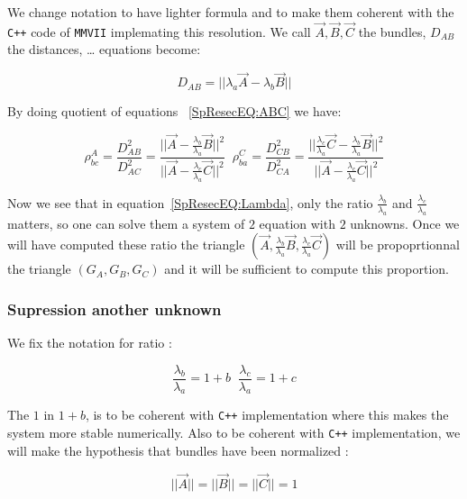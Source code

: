 We change notation to have lighter formula and to make them coherent with the {\tt C++} code of {\tt MMVII}
implemating this resolution. We call $\Vec{A} , \Vec{B}, \Vec{C}$  the bundles, $D_{AB}$ the distances, \dots
equations become:


\begin{equation}
	D_{AB} = || \lambda_a \Vec{A} -  \lambda_{b} \Vec{B} || \label{SpResecEQ:ABC}
\end{equation}

By doing quotient of equations ~\ref{SpResecEQ:ABC} we have:

\begin{equation}
	\rho^A_{bc}  
	=	\frac{D^2_{AB}}{D^2_{AC}} 
	= \frac{|| \Vec{A} -  \frac{\lambda_{b}}{\lambda_{a}} \Vec{B} ||^2 }{||\Vec{A} -  \frac{\lambda_{c}}{\lambda_{a}} \Vec{C}||^2}
	\;\;
	\rho^C_{ba}  
	=	\frac{D^2_{CB}}{D^2_{CA}} 
	= \frac{|| \frac{\lambda_{c}}{\lambda_{a}} \Vec{C} -  \frac{\lambda_{b}}{\lambda_{a}} \Vec{B} ||^2 }
	       {||\Vec{A} -  \frac{\lambda_{c}}{\lambda_{a}} \Vec{C}||^2}
	       \label{SpResecEQ:Lambda}
\end{equation}

Now we see that in equation~\ref{SpResecEQ:Lambda}, only the ratio $\frac{\lambda_{b}}{\lambda_{a}}$ and $\frac{\lambda_{c}}{\lambda_{a}}$
matters, so one can solve them a system of $2$ equation with $2$ unknowns. Once we will have computed these ratio the triangle
$(\Vec{A} , \frac{\lambda_{b}}{\lambda_{a}} \Vec{B},  \frac{\lambda_{c}}{\lambda_{a}} \Vec{C})$ will be propoprtionnal the
triangle $(G_A,G_B,G_C)$ and it will be sufficient to compute this proportion.


\subsubsection{Supression another unknown}

We fix the notation for ratio :

\begin{equation}
	\frac{\lambda_{b}}{\lambda_{a}} = 1+ b  \;\;
	\frac{\lambda_{c}}{\lambda_{a}} = 1+ c
\end{equation}


The $1$ in $1+b$, is to be coherent with {\tt C++} implementation where this makes the system more stable numerically.
Also to be coherent with {\tt C++} implementation, we will make the hypothesis that bundles have been normalized :

\begin{equation}
	|| \Vec{A}|| = || \Vec{B}|| = || \Vec{C}|| = 1
\end{equation}

